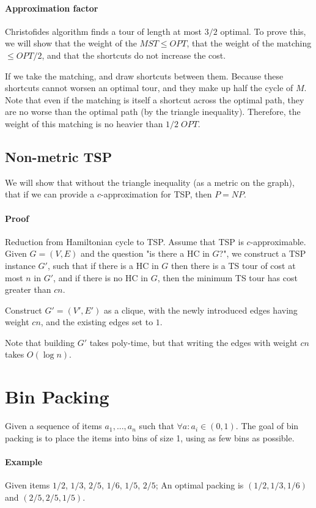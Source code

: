 \documentclass[a4paper]{article}
\begin{document}
\paragraph{Approximation factor}
Christofides algorithm finds a tour of length at most $3/2$ optimal. To prove this, we will show that the weight of the $MST \le OPT$, that the weight of the matching $\le OPT/2$, and that the shortcuts do not increase the cost.

If we take the matching, and draw shortcuts between them. Because these shortcuts cannot worsen an optimal tour, and they make up half the cycle of $M$. Note that even if the matching is itself a shortcut across the optimal path, they are no worse than the optimal path (by the triangle inequality). Therefore, the weight of this matching is no heavier than $1/2\;OPT$.

\subsection{Non-metric TSP}
We will show that without the triangle inequality (as a metric on the graph), that if we can provide a $c$-approximation for TSP, then $P=NP$.

\paragraph{Proof}
Reduction from Hamiltonian cycle to TSP. Assume that TSP is $c$-approximable. Given $G=(V,E)$ and the question "is there a HC in $G$?", we construct a TSP instance $G'$, such that if there is a HC in $G$ then there is a TS tour of cost at most $n$ in $G'$, and if there is no HC in $G$, then the minimum TS tour has cost greater than $cn$.

Construct $G'=(V',E')$ as a clique, with the newly introduced edges having weight $cn$, and the existing edges set to $1$.

Note that building $G'$ takes poly-time, but that writing the edges with weight $cn$ takes $O(\log n)$.

\section{Bin Packing}
Given a sequence of items $a_1,...,a_n$ such that $\forall a : a_i \in (0,1)$. The goal of bin packing is to place the items into bins of size 1, using as few bins as possible.

\paragraph{Example}
Given items $1/2$, $1/3$, $2/5$, $1/6$, $1/5$, $2/5$; An optimal packing is $(1/2, 1/3, 1/6)$ and $(2/5, 2/5, 1/5)$.
\end{document}
